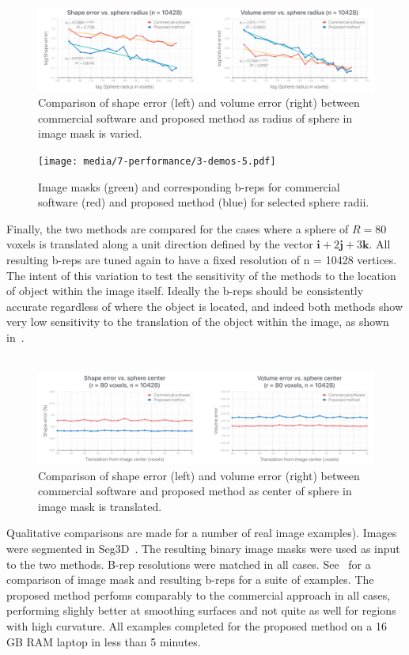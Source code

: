 \begin{figure}[ht!]
	\centering
	\includegraphics[scale=0.25]{media/7-performance/1-graph-2.pdf}
	\caption{Comparison of shape error (left) and volume error (right) between commercial software and proposed method as radius of sphere in image mask is varied.}
	\label{fig:graph2}
\end{figure}
\begin{figure}[ht!]
	\centering
	\texttt{[image: media/7-performance/3-demos-5.pdf]}
	\caption{Image masks (green) and corresponding b-reps for commercial software (red) and proposed method (blue) for selected sphere radii.}
	\label{fig:demos2}
\end{figure}
%
Finally, the two methods are compared for the cases where a sphere of $R = 80$ voxels is translated along a unit direction defined by the vector $\bm{i}  + 2\bm{j} + 3\bm{k}$. All resulting b-reps are tuned again to have a fixed resolution of n = 10428 vertices. The intent of this variation to test the sensitivity of the methods to the location of object within the image itself. Ideally the b-reps should be consistently accurate regardless of where the object is located, and indeed both methods show very low sensitivity to the translation of the object within the image, as shown in~. \\ \\
\begin{figure}[ht!]
	\centering
	\includegraphics[scale=0.25]{media/7-performance/2-graph-3.pdf}
	\caption{Comparison of shape error (left) and volume error (right) between commercial software and proposed method as center of sphere in image mask is translated.}
	\label{fig:graph3}
\end{figure}
%
Qualitative comparisons are made for a number of real image examples). Images were segmented in Seg3D~\cite{Seg3D}. The resulting binary image masks were used as input to the two methods. B-rep resolutions were matched in all cases. See~ for a comparison of image mask and resulting b-reps for a suite of examples. The proposed method perfoms comparably to the commercial approach in all cases, performing slighly better at smoothing surfaces and not quite as well for regions with high curvature. All examples completed for the proposed method on a 16 GB RAM laptop in less than 5 minutes.
